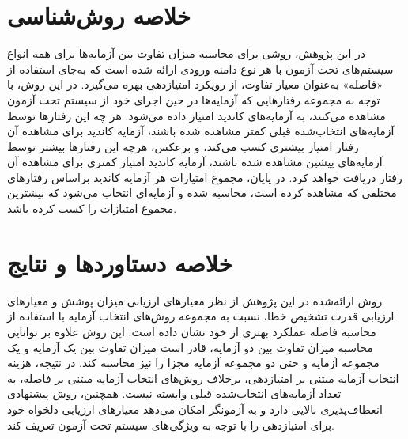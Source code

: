 %
%
%

\section{خلاصه روش‌شناسی}

در این پژوهش، روشی برای محاسبه میزان تفاوت بین آزمایه‌ها برای همه انواع سیستم‌های تحت آزمون با هر نوع دامنه ورودی ارائه شده است که به‌جای استفاده از «فاصله» به‌عنوان معیار تفاوت، از رویکرد امتیازدهی بهره می‌گیرد. در این روش، با توجه به مجموعه‌ رفتارهایی که آزمایه‌ها در حین اجرای خود از سیستم تحت آزمون مشاهده می‌کنند، به آزمایه‌های کاندید امتیاز داده می‌شود. هر چه این رفتارها توسط آزمایه‌های انتخاب‌شده قبلی کمتر مشاهده شده باشند، آزمایه کاندید برای مشاهده آن رفتار امتیاز بیشتری کسب می‌کند، و برعکس، هرچه این رفتارها بیشتر توسط آزمایه‌های پیشین مشاهده شده باشند، آزمایه کاندید امتیاز کمتری برای مشاهده آن رفتار دریافت خواهد کرد. در پایان، مجموع امتیازات هر آزمایه کاندید براساس رفتارهای مختلفی که مشاهده کرده است، محاسبه شده و آزمایه‌ای انتخاب می‌شود که بیشترین مجموع امتیازات را کسب کرده باشد.

\section{خلاصه دستاوردها و نتایج}

روش ارائه‌شده در این پژوهش از نظر معیارهای ارزیابی میزان پوشش و معیارهای ارزیابی قدرت تشخیص خطا، نسبت به مجموعه روش‌های انتخاب آزمایه با استفاده از محاسبه فاصله عملکرد بهتری از خود نشان داده است. این روش علاوه بر توانایی محاسبه میزان تفاوت بین دو آزمایه، قادر است میزان تفاوت بین یک آزمایه و یک مجموعه آزمایه و حتی دو مجموعه آزمایه مجزا را نیز محاسبه کند. در نتیجه، هزینه انتخاب آزمایه مبتنی بر امتیازدهی، برخلاف روش‌های انتخاب آزمایه مبتنی بر فاصله، به تعداد آزمایه‌های انتخاب‌شده قبلی وابسته نیست.
همچنین، روش پیشنهادی انعطاف‌پذیری بالایی دارد و به آزمونگر امکان می‌دهد معیارهای ارزیابی دلخواه خود برای امتیازدهی را با توجه به ویژگی‌های سیستم تحت آزمون تعریف کند.


